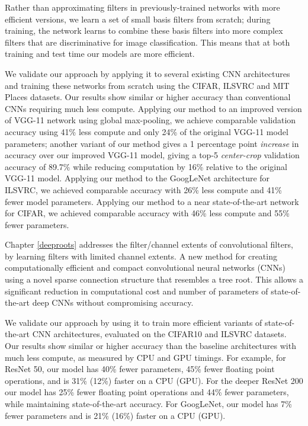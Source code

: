 \documentclass[thesis]{subfiles}
\begin{document}
Rather than approximating filters in previously-trained networks with more efficient versions, we learn a set of small basis filters from scratch; during training, the network learns to combine these basis filters into more complex filters that are discriminative for image classification. This means that at both training and test time our models are more efficient.

We validate our approach by applying it to several existing CNN architectures and training these networks from scratch using the CIFAR, ILSVRC and MIT Places datasets. Our results show similar or higher accuracy than conventional CNNs requiring much less compute. Applying our method to an improved version of VGG-11 network using global max-pooling, we achieve comparable validation accuracy using 41\% less compute and only 24\% of the original VGG-11 model parameters; another variant of our method gives a 1 percentage point {\em increase} in accuracy over our improved VGG-11 model, giving a top-5 \emph{center-crop} validation accuracy of 89.7\% while reducing computation by 16\% relative to the original VGG-11 model. Applying our method to the GoogLeNet architecture for ILSVRC, we achieved comparable accuracy with 26\% less compute and 41\% fewer model parameters. Applying our method to a near state-of-the-art network for CIFAR, we achieved comparable accuracy with 46\% less compute and 55\% fewer parameters. 
	
Chapter \ref{deeproots} addresses the filter/channel extents of convolutional filters, by learning filters with limited channel extents. A new method for creating computationally efficient and compact convolutional neural networks (CNNs) using a novel sparse connection structure that resembles a tree root. This allows a significant reduction in computational cost and number of parameters of state-of-the-art deep CNNs without compromising accuracy. 
	
We validate our approach by using it to train more efficient variants of state-of-the-art CNN architectures, evaluated on the CIFAR10 and ILSVRC datasets. Our results show similar or higher accuracy than the baseline architectures with much less compute, as measured by CPU and GPU timings. For example, for ResNet 50, our model has 40\% fewer parameters, 45\% fewer floating point operations, and is 31\% (12\%) faster on a CPU (GPU). For the deeper ResNet 200 our model has 25\% fewer floating point operations and 44\% fewer parameters, while maintaining state-of-the-art accuracy. For GoogLeNet, our model has 7\% fewer parameters and is 21\% (16\%) faster on a CPU (GPU).
\end{document}
